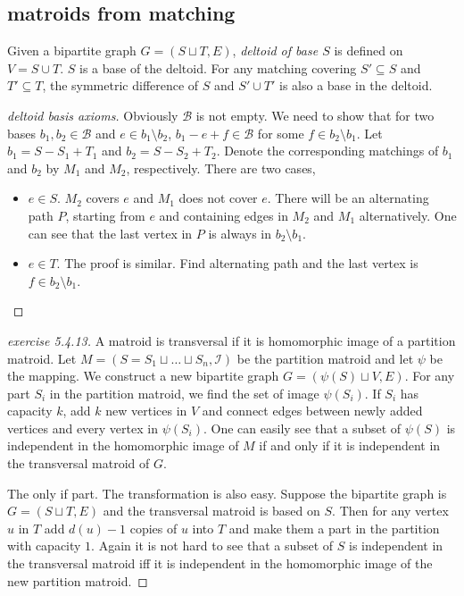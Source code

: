 \subsection{matroids from matching}
Given a bipartite graph $G=(S\sqcup T, E)$, \emph{deltoid of base $S$} is defined on $V=S\cup T$. $S$ is a base of the deltoid. For any matching covering $S'\subseteq S$ and $T'\subseteq T$, the symmetric difference of $S$ and $S'\cup T'$ is also a base in the deltoid.
\begin{proof}[deltoid basis axioms]
    Obviously $\mathcal B$ is not empty. We need to show that for two bases $b_1,b_2\in \mathcal B$ and $e\in b_1\setminus b_2$, $b_1-e+f\in \mathcal{B}$ for some $f\in b_2\setminus b_1$. Let $b_1=S-S_1+T_1$ and $b_2=S-S_2+T_2$. Denote the corresponding matchings of $b_1$ and $b_2$ by $M_1$ and $M_2$, respectively. There are two cases,
    \begin{itemize}
        \item $e\in S$. $M_2$ covers $e$ and $M_1$ does not cover $e$. There will be an alternating path $P$, starting from $e$ and containing edges in $M_2$ and $M_1$ alternatively. One can see that the last vertex in $P$ is always in $b_2\setminus b_1$.
        \item $e\in T$. The proof is similar. Find alternating path and the last vertex is $f\in b_2\setminus b_1$.
    \end{itemize}
\end{proof}
\begin{proof}[exercise 5.4.13]
    A matroid is transversal if it is homomorphic image of a partition matroid. Let $M=(S=S_1\sqcup\ldots \sqcup S_n,\mathcal I)$ be the partition matroid and let $\psi$ be the mapping. We construct a new bipartite graph $G=(\psi(S)\sqcup V,E)$. For any part $S_i$ in the partition matroid, we find the set of image $\psi(S_i)$. If $S_i$ has capacity $k$, add $k$ new vertices in $V$ and connect edges between newly added vertices and every vertex in $\psi(S_i)$. One can easily see that a subset of $\psi(S)$ is independent in the homomorphic image of $M$ if and only if it is independent in the transversal matroid of $G$.

    The only if part. The transformation is also easy. Suppose the bipartite graph is $G=(S\sqcup T, E)$ and the transversal matroid is based on $S$. Then for any vertex $u$ in $T$ add $d(u)-1$ copies of $u$ into $T$ and make them a part in the partition with capacity $1$. Again it is not hard to see that a subset of $S$ is independent in the transversal matroid iff it is independent in the homomorphic image of the new partition matroid.
\end{proof}

